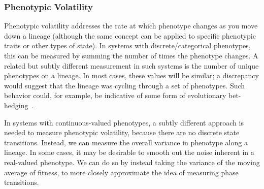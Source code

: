 \documentclass[letterpaper]{article}
\begin{document}
\subsubsection{Phenotypic Volatility}

Phenotypic volatility addresses the rate at which phenotype changes as you move down a lineage (although the same concept can be applied to specific phenotypic traits or other types of state). In systems with discrete/categorical phenotypes, this can be measured by summing the number of times the phenotype changes. A related but subtly different measurement in such systems is the number of unique phenotypes on a lineage. In most cases, these values will be similar; a discrepancy
would suggest that the lineage was %
cycling through a set of
phenotypes. Such behavior could, for example, be indicative of some form of evolutionary bet-hedging~\citep{beaumont2009experimental}. %

In systems with continuous-valued phenotypes, a subtly different approach is needed to measure phenotypic volatility, because there are no discrete state transitions. Instead, we can measure the overall variance in phenotype along a lineage. In some cases, it may be desirable to smooth out the noise inherent in a real-valued phenotype. We can do so by instead taking the variance of the moving average of fitness, to more closely approximate the idea of measuring phase transitions.

\end{document}
